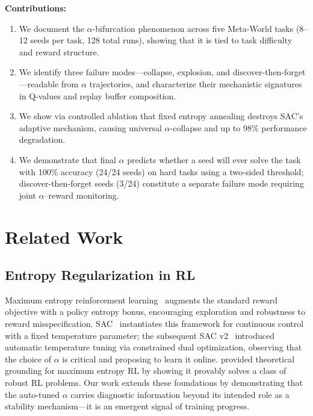 \documentclass[twocolumn]{article}
\begin{document}
\textbf{Contributions:}
\begin{enumerate}
    \item We document the $\alpha$-bifurcation phenomenon across five
    Meta-World tasks (8--12 seeds per task, 128 total runs), showing
    that it is tied to task difficulty and reward structure.
    \item We identify three failure modes---collapse, explosion, and
    discover-then-forget---readable from $\alpha$ trajectories, and
    characterize their mechanistic signatures in Q-values and replay buffer
    composition.
    \item We show via controlled ablation that fixed entropy annealing
    destroys SAC's adaptive mechanism, causing universal $\alpha$-collapse
    and up to 98\% performance degradation.
    \item We demonstrate that final $\alpha$ predicts whether a seed will
    ever solve the task with 100\% accuracy (24/24 seeds) on hard tasks
    using a two-sided threshold; discover-then-forget seeds (3/24) constitute
    a separate failure mode requiring joint $\alpha$--reward monitoring.
\end{enumerate}


\section{Related Work}
\label{sec:related}

\subsection{Entropy Regularization in RL}

Maximum entropy reinforcement learning~\citep{ziebart2010} augments the
standard reward objective with a policy entropy bonus, encouraging
exploration and robustness to reward misspecification. SAC~\citep{haarnoja2018a}
instantiates this framework for continuous control with a fixed temperature
parameter; the subsequent SAC v2~\citep{haarnoja2018b} introduced automatic
temperature tuning via constrained dual optimization, observing that the choice
of $\alpha$ is critical and proposing to learn it online. \citet{eysenbach2022}
provided theoretical grounding for maximum entropy RL by showing it provably
solves a class of robust RL problems. Our work extends these foundations by
demonstrating that the auto-tuned $\alpha$ carries diagnostic information beyond
its intended role as a stability mechanism---it is an emergent signal of
training progress.
\end{document}
